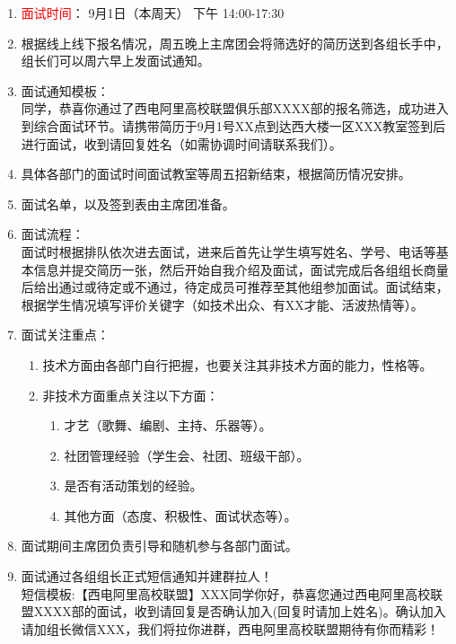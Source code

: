 \begin{enumerate}
  \item \textcolor{red}{面试时间}：     9月1日（本周天） 下午 14:00-17:30
  \item 根据线上线下报名情况，周五晚上主席团会将筛选好的简历送到各组长手中，组长们可以周六早上发面试通知。
  \item 面试通知模板：\\
  \indent 同学，恭喜你通过了西电阿里高校联盟俱乐部XXXX部的报名筛选，成功进入到综合面试环节。请携带简历于9月1号XX点到达西大楼一区XXX教室签到后进行面试，收到请回复姓名（如需协调时间请联系我们）。

  \item 具体各部门的面试时间面试教室等周五招新结束，根据简历情况安排。
  \item 面试名单，以及签到表由主席团准备。
  \item 面试流程：\\
  \indent 面试时根据排队依次进去面试，进来后首先让学生填写姓名、学号、电话等基本信息并提交简历一张，然后开始自我介绍及面试，面试完成后各组组长商量后给出通过或待定或不通过，待定成员可推荐至其他组参加面试。面试结束，根据学生情况填写评价关键字（如技术出众、有XX才能、活波热情等）。
  \item 面试关注重点：
  \begin{enumerate}
    \item 技术方面由各部门自行把握，也要关注其非技术方面的能力，性格等。
    \item 非技术方面重点关注以下方面：
    \begin{enumerate}[(1)]
      \item 才艺（歌舞、编剧、主持、乐器等）。
      \item 社团管理经验（学生会、社团、班级干部）。
      \item 是否有活动策划的经验。
      \item 其他方面（态度、积极性、面试状态等）。
    \end{enumerate}
  \end{enumerate}
  \item 面试期间主席团负责引导和随机参与各部门面试。
  \item 面试通过各组组长正式短信通知并建群拉人！\\
  短信模板:【西电阿里高校联盟】XXX同学你好，恭喜您通过西电阿里高校联盟XXXX部的面试，收到请回复是否确认加入(回复时请加上姓名)。确认加入请加组长微信XXX，我们将拉你进群，西电阿里高校联盟期待有你而精彩！
\end{enumerate}




